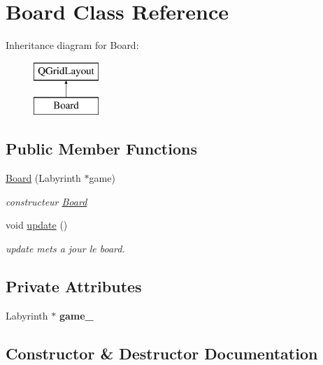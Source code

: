 \hypertarget{class_board}{}\section{Board Class Reference}
\label{class_board}
Inheritance diagram for Board\+:\begin{figure}[H]
\begin{center}
\leavevmode
\includegraphics[height=2.000000cm]{class_board}
\end{center}
\end{figure}
\subsection*{Public Member Functions}
\begin{DoxyCompactItemize}
\item 
\mbox{\hyperlink{class_board_ac3267e47810e8951899b852daa9d2f38}{Board}} (Labyrinth $\ast$game)
\begin{DoxyCompactList}\small\item\em constructeur \mbox{\hyperlink{class_board}{Board}} \end{DoxyCompactList}\item 
\mbox{\label{class_board_aa170cb05bb38de48e19a72b51d898eca}} 
void \mbox{\hyperlink{class_board_aa170cb05bb38de48e19a72b51d898eca}{update}} ()
\begin{DoxyCompactList}\small\item\em update mets a jour le board. \end{DoxyCompactList}\end{DoxyCompactItemize}
\subsection*{Private Attributes}
\begin{DoxyCompactItemize}
\item 
\mbox{\label{class_board_afc223806fde02c0bda335aa365d82b4d}} 
Labyrinth $\ast$ {\bfseries game\+\_\+}
\end{DoxyCompactItemize}


\subsection{Constructor \& Destructor Documentation}
\mbox{\label{class_board_ac3267e47810e8951899b852daa9d2f38}} 
